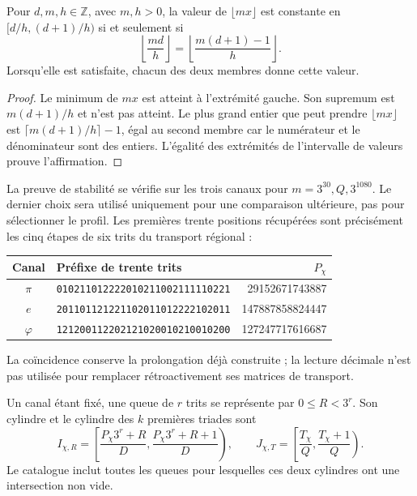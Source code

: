 \begin{lemma}
\label{censo:estabilidad}
Pour \(d,m,h\in\mathbb Z\), avec \(m,h>0\), la valeur de
\(\lfloor mx\rfloor\) est constante en \([d/h,(d+1)/h)\) si et seulement si
\begin{equation}
 \left\lfloor\frac{md}{h}\right\rfloor
 =\left\lfloor\frac{m(d+1)-1}{h}\right\rfloor.
 \label{censo:prueba-estabilidad}
\end{equation}
Lorsqu'elle est satisfaite, chacun des deux membres donne cette valeur.
\end{lemma}
\begin{proof}
Le minimum de \(mx\) est atteint à l'extrémité gauche. Son supremum
est \(m(d+1)/h\) et n'est pas atteint. Le plus grand entier que peut prendre
\(\lfloor mx\rfloor\) est
\(\lceil m(d+1)/h\rceil-1\), égal au second membre car
le numérateur et le dénominateur sont des entiers. L'égalité des extrémités
de l'intervalle de valeurs prouve l'affirmation.
\end{proof}

La preuve de stabilité se vérifie sur les trois canaux pour
\(m=3^{30},Q,3^{1080}\). Le dernier choix sera utilisé uniquement
pour une comparaison ultérieure, pas pour sélectionner le profil. Les
premières trente positions récupérées sont précisément les cinq
étapes de six trits du transport régional :
\begin{center}\small
\begin{tabular}{@{}c l r@{}}\toprule
Canal&Préfixe de trente trits&\(P_\chi\)\\\midrule
\(\pi\)&\texttt{010211012222010211002111110221}&29152671743887\\
\(e\)&\texttt{201101121221102011012222102011}&147887858824447\\
\(\varphi\)&\texttt{121200112202121020010210010200}&127247717616687\\\bottomrule
\end{tabular}
\end{center}
La coïncidence conserve la prolongation déjà construite ; la lecture décimale
n'est pas utilisée pour remplacer rétroactivement ses matrices de transport.

Un canal étant fixé, une queue de \(r\) trits se représente par
\(0\leq R<3^r\). Son cylindre et le cylindre des \(k\) premières
triades sont
\begin{equation}
 I_{\chi,R}=\left[\frac{P_\chi3^r+R}{D},
                       \frac{P_\chi3^r+R+1}{D}\right),\qquad
 J_{\chi,T}=\left[\frac{T_\chi}{Q},\frac{T_\chi+1}{Q}\right).
 \label{censo:dos-cilindros}
\end{equation}
Le catalogue inclut toutes les queues pour lesquelles ces deux cylindres
ont une intersection non vide.

